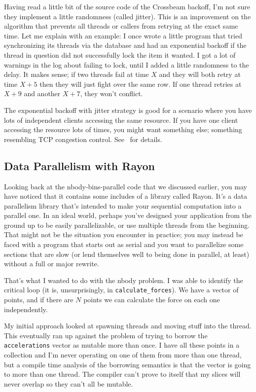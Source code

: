 \documentclass[a4paper]{report}
\begin{document}
Having read a little bit of the source code of the Crossbeam backoff, I'm not sure they implement a little randomness (called jitter). This is an improvement on the algorithm that prevents all threads or callers from retrying at the exact same time. Let me explain with an example: I once wrote a little program that tried synchronizing its threads via the database and had an exponential backoff if the thread in question did not successfully lock the item it wanted. I got a lot of warnings in the log about failing to lock, until I added a little randomness to the delay. It makes sense; if two threads fail at time $X$ and they will both retry at time $X+5$ then they will just fight over the same row. If one thread retries at $X+9$ and another $X+7$, they won't conflict.

The exponential backoff with jitter strategy is good for a scenario where you have lots of independent clients accessing the same resource. If you have one client accessing the resource lots of times, you might want something else; something resembling TCP congestion control. See~\cite{expbackoff} for details. 

\subsection*{Data Parallelism with Rayon}

Looking back at the nbody-bins-parallel code that we discussed earlier, you may have noticed that it contains some includes of a library called Rayon. It's a data parallelism library that's intended to make your sequential computation into a parallel one. In an ideal world, perhaps you've designed your application from the ground up to be easily parallelizable, or use multiple threads from the beginning. That might not be the situation you encounter in practice; you may instead be faced with a program that starts out as serial and you want to parallelize some sections that are slow (or lend themselves well to being done in parallel, at least) without a full or major rewrite.

That's what I wanted to do with the nbody problem. I was able to identify the critical loop (it is, unsurprisingly, in \texttt{calculate\_forces}). We have a vector of points, and if there are $N$ points we can calculate the force on each one independently. 

My initial approach looked at spawning threads and moving stuff into the thread. This eventually ran up against the problem of trying to borrow the \texttt{accelerations} vector as mutable more than once. I have all these points in a collection and I'm never operating on one of them from more than one thread, but a compile time analysis of the borrowing semantics is that the vector is going to more than one thread. The compiler can't prove to itself that my slices will never overlap so they can't all be mutable.
\end{document}
